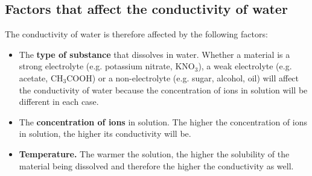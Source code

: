             \subsection*{Factors that affect the conductivity of water}
            \nopagebreak
            \label{m38720*id339287}The conductivity of water is therefore affected by the following factors:\par 
        \label{m38720*id339291}\begin{itemize}[noitemsep]
            \label{m38720*uid57}\item The \textbf{type of substance} that dissolves in water.
Whether a material is a strong electrolyte (e.g. potassium nitrate, ${\mathrm{KNO}}_{3}$), a weak electrolyte (e.g. acetate, ${\mathrm{CH}}_{3}\mathrm{COOH}$) or a non-electrolyte (e.g. sugar, alcohol, oil) will affect the conductivity of water because the concentration of ions in solution will be different in each case.
\label{m38720*uid58}\item The \textbf{concentration of ions} in solution.
The higher the concentration of ions in solution, the higher its conductivity will be.
\label{m38720*uid59}\item \textbf{Temperature.}
The warmer the solution, the higher the solubility of the material being dissolved and therefore the higher the conductivity as well.
\end{itemize}
\label{m38720*secfhsst!!!underscore!!!id739}

